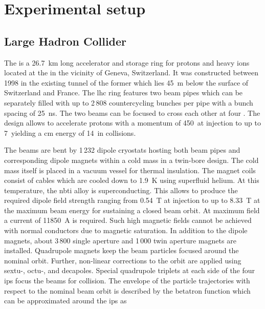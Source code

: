 \chapter{Experimental setup}
\label{ch:exp}


\section{Large Hadron Collider}

The  is a 26.7~km long accelerator and storage ring for protons and heavy ions located at the  in the vicinity of Geneva, Switzerland. It was constructed between 1998 in the existing tunnel of the former  which lies 45~m below the surface of Switzerland and France. The \gls{lhc} ring features two beam pipes which can be separately filled with up to 2\,808 countercycling bunches per pipe with a bunch spacing of 25~ns. The two beams can be focused to cross each other at four . The design allows to accelerate protons with a momentum of 450~\GeV at injection to up to 7~\TeV yielding a \acrlong{cm} energy of 14~\TeV in collisions.

The beams are bent by 1\,232 dipole cryostats hosting both beam pipes and corresponding dipole magnets within a cold mass in a twin-bore design. The cold mass itself is placed in a vacuum vessel for thermal insulation. The magnet coils consist of   cables which are cooled down to 1.9~K using superfluid helium. At this temperature, the \gls{nbti} alloy is superconducting. This allows to produce the required dipole field strength ranging from 0.54~T at injection to up to 8.33~T at the maximum beam energy for sustaining a closed beam orbit. At maximum field a current of 11850~A is required. Such high magnetic fields cannot be achieved with normal conductors due to magnetic saturation. In addition to the dipole magnets, about 3\,800 single aperture and 1\,000 twin aperture magnets are installed. Quadrupole magnets keep the beam particles focused around the nominal orbit. Further, non-linear corrections to the orbit are applied using sextu-, octu-, and decapoles. Special quadrupole triplets at each side of the four \glspl{ip} focus the beams for collision. The envelope of the particle trajectories with respect to the nominal beam orbit is described by the betatron function which can be approximated around the \glspl{ip} as 

